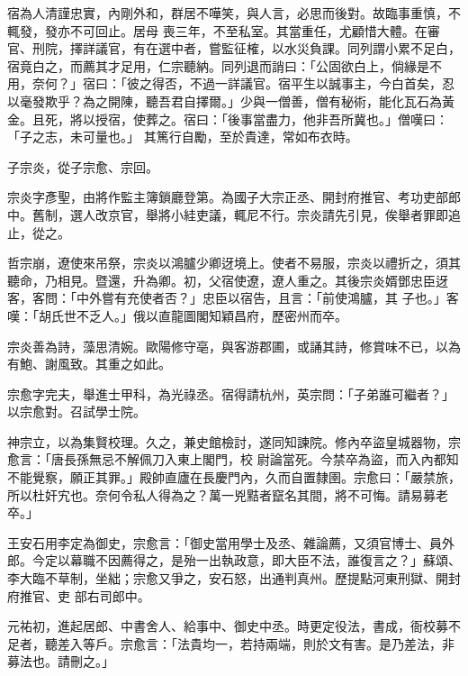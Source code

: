 \begin{pinyinscope}
 宿為人清謹忠實，內剛外和，群居不嘩笑，與人言，必思而後對。故臨事重慎，不輒發，發亦不可回止。居母
 喪三年，不至私室。其當重任，尤顧惜大體。在審官、刑院，擇詳議官，有在選中者，嘗監征榷，以水災負課。同列謂小累不足白，宿竟白之，而薦其才足用，仁宗聽納。同列退而誚曰：「公固欲白上，倘緣是不用，奈何？」宿曰：「彼之得否，不過一詳議官。宿平生以誠事主，今白首矣，忍以毫發欺乎？為之開陳，聽吾君自擇爾。」少與一僧善，僧有秘術，能化瓦石為黃金。且死，將以授宿，使葬之。宿曰：「後事當盡力，他非吾所冀也。」僧嘆曰：「子之志，未可量也。」
 其篤行自勵，至於貴達，常如布衣時。



 子宗炎，從子宗愈、宗回。



 宗炎字彥聖，由將作監主簿鎖廳登第。為國子大宗正丞、開封府推官、考功吏部郎中。舊制，選人改京官，舉將小絓吏議，輒尼不行。宗炎請先引見，俟舉者罪即追止，從之。



 哲宗崩，遼使來吊祭，宗炎以鴻臚少卿迓境上。使者不易服，宗炎以禮折之，須其聽命，乃相見。暨還，升為卿。初，父宿使遼，遼人重之。其後宗炎婿鄧忠臣迓客，客問：「中外嘗有充使者否？」忠臣以宿告，且言：「前使鴻臚，其
 子也。」客嘆：「胡氏世不乏人。」俄以直龍圖閣知穎昌府，歷密州而卒。



 宗炎善為詩，藻思清婉。歐陽修守亳，與客游郡圃，或誦其詩，修賞味不已，以為有鮑、謝風致。其重之如此。



 宗愈字完夫，舉進士甲科，為光祿丞。宿得請杭州，英宗問：「子弟誰可繼者？」以宗愈對。召試學士院。



 神宗立，以為集賢校理。久之，兼史館檢討，遂同知諫院。修內卒盜皇城器物，宗愈言：「唐長孫無忌不解佩刀入東上閣門，校
 尉論當死。今禁卒為盜，而入內都知不能覺察，願正其罪。」殿帥直廬在長慶門內，久而自置隸圉。宗愈曰：「嚴禁旅，所以杜奸宄也。奈何令私人得為之？萬一兇黠者竄名其間，將不可悔。請易募老卒。」



 王安石用李定為御史，宗愈言：「御史當用學士及丞、雜論薦，又須官博士、員外郎。今定以幕職不因薦得之，是殆一出執政意，即大臣不法，誰復言之？」蘇頌、李大臨不草制，坐絀；宗愈又爭之，安石怒，出通判真州。歷提點河東刑獄、開封府推官、吏
 部右司郎中。



 元祐初，進起居郎、中書舍人、給事中、御史中丞。時更定役法，書成，衙校募不足者，聽差入等戶。宗愈言：「法貴均一，若持兩端，則於文有害。是乃差法，非募法也。請刪之。」




\end{pinyinscope}
